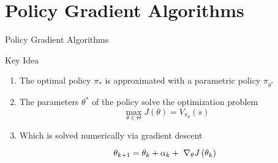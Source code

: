 \section{Policy Gradient Algorithms}


\begin{frame}{Policy Gradient Algorithms}
	
	\begin{block}{Key Idea}
	\begin{enumerate}
		\item<+-> The optimal policy $\pi_*$ is approximated with a parametric policy $\pi_{\theta^*}$
		\item<+-> The parameters $\theta^*$ of the policy solve the optimization problem 
		\begin{equation*}
			\max_{\theta \in \Theta} J(\theta) = V_{\pi_\theta}(s)
		\end{equation*}
		\item<+-> Which is solved numerically via gradient descent
		\begin{equation*}
		\theta_{k+1} = \theta_k + \alpha_k + 
       		\tikz[baseline]{
           		\node[anchor=base] (gradient) {$\nabla_\theta J\left(\theta_k\right)$};
       	   }
		\end{equation*}
	\end{enumerate}
	\end{block}
	
\end{frame}

